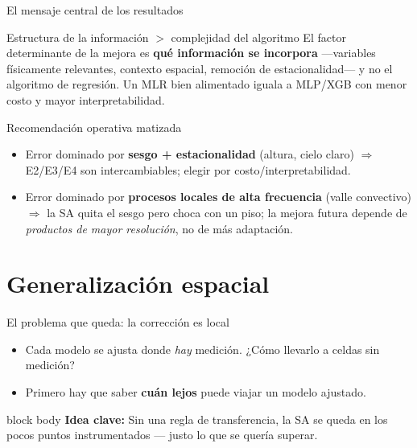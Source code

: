 \documentclass[aspectratio=169,11pt]{beamer}
\newcommand{\clave}[1]{%
  \begin{beamercolorbox}[wd=\linewidth,sep=6pt,rounded=true]{block body}%
    \footnotesize\textbf{\color{primary}Idea clave: }#1%
  \end{beamercolorbox}}
\begin{document}
\begin{frame}{El mensaje central de los resultados}
  \footnotesize
  \begin{block}{Estructura de la información $>$ complejidad del algoritmo}
    El factor determinante de la mejora es \textbf{qué información se incorpora} —variables físicamente relevantes, contexto espacial, remoción de estacionalidad— y no el algoritmo de regresión. Un MLR bien alimentado iguala a MLP/XGB con menor costo y mayor interpretabilidad.
  \end{block}
  \begin{block}{Recomendación operativa matizada}
    \scriptsize
    \begin{itemize}
      \item Error dominado por \textbf{sesgo + estacionalidad} (altura, cielo claro) $\Rightarrow$ E2/E3/E4 son intercambiables; elegir por costo/interpretabilidad.
      \item Error dominado por \textbf{procesos locales de alta frecuencia} (valle convectivo) $\Rightarrow$ la SA quita el sesgo pero choca con un piso; la mejora futura depende de \emph{productos de mayor resolución}, no de más adaptación.
    \end{itemize}
  \end{block}
\end{frame}

\section{Generalización espacial}

\begin{frame}{El problema que queda: la corrección es local}
  \footnotesize
  \begin{itemize}
    \item Cada modelo se ajusta donde \emph{hay} medición. ¿Cómo llevarlo a celdas sin medición?
    \item Primero hay que saber \textbf{cuán lejos} puede viajar un modelo ajustado.
  \end{itemize}
  \vspace{0.3em}
  \clave{Sin una regla de transferencia, la SA se queda en los pocos puntos instrumentados — justo lo que se quería superar.}
\end{frame}
\end{document}
